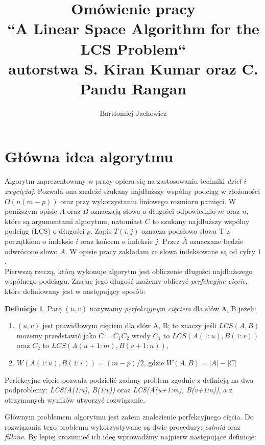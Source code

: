 \documentclass[12pt]{article}
\title{Omówienie pracy\\
``A Linear Space Algorithm for the LCS Problem``\\
autorstwa S. Kiran Kumar oraz C. Pandu Rangan
}
\author{Bartłomiej Jachowicz}
\date{}
\theoremstyle{definition}
\newtheorem{definition}{Definicja}[section]
\theoremstyle{definition}
\theoremstyle{definition}
\begin{document}
\maketitle

\section{Główna idea algorytmu}
Algorytm zaprezentowany w pracy opiera się na zastosowaniu techniki \textit{dziel i zwyciężaj}. Pozwala ona znaleźć szukany najdłuższy wspólny podciąg w złożoności $O(n(m - p))$ oraz przy wykorzystaniu liniowego rozmiaru pamięci. W poniższym opisie $A$ oraz $B$ oznaczają słowa o długości odpowiednio $m$ oraz $n$, które są argumentami algorytmu, natomiast $C$ to szukany najdłuższy wspólny podciąg (LCS) o długości $p$. Zapis $T(i:j)$ oznacza podsłowo słowa T z początkiem o indeksie $i$ oraz końcem o indeksie $j$. Przez $\bar{A}$ oznaczane będzie odwrócone słowo $A$. W opisie pracy zakładam że słowa indeksowane są od cyfry $1$.\\

Pierwszą rzeczą, którą wykonuje algorytm jest obliczenie długości najdłuższego wspólnego podciągu. Znając jego długość możemy obliczyć \textit{perfekcyjne cięcie}, które definiowany jest w następujący sposób:

\begin{definition}{}
Parę $(u, v)$ nazywamy \textit{perfekcyjnym cięciem} dla słów A, B jeżeli:
\begin{enumerate}
    \item $(u, v)$ jest prawidłowym cięciem dla słów A, B; to znaczy jeśli $LCS(A, B)$ możemy przedstawić jako $C = C_1C_2$ wtedy $C_1$ to $LCS(A(1:u), B(1:v))$ oraz $C_2$ to $LCS(A(u+1:m), B(v+1:n))$,
    \item $W(A(1:u), B(1:v)) = (m - p)/2$, gdzie $W(A, B) = |A| - |C|$
\end{enumerate}
\end{definition}

Perfekcyjne cięcie pozwala podzielić zadany problem zgodnie z definicją na dwa podproblemy: \textit{LCS(A(1:u), B(1:v))} oraz \textit{LCS(A(u+1:m), B(v+1:n))}, a z otrzymanych wyników utworzyć rozwiązanie.

Głównym problemem algorytmu jest zatem znalezienie perfekcyjnego cięcia. Do rozwiązania tego problemu wykorzystywane są dwie procedury: \textit{calmid} oraz \textit{fillone}. By lepiej zrozumieć ich ideę wprowadźmy najpierw następujące definicje:
\end{document}
